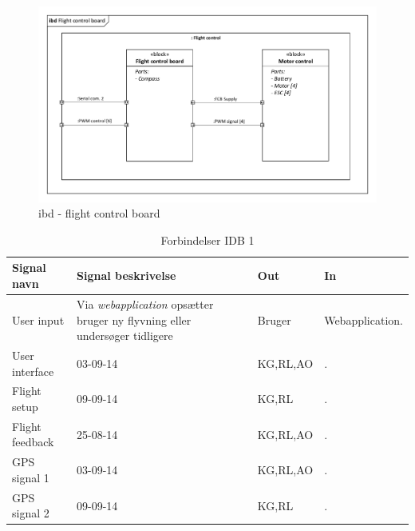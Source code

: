 

\begin{figure}[H]
\centering
\includegraphics[width=1\textwidth]{Billeder/IBD/ibd5_flightcontrolboard.pdf}
\caption{ibd - flight control board}
\label{fig:ibd_flightcontrolboard}
\end{figure}

\begin{table}[H]
	\centering
		\begin{tabular}{|p{2.5 cm}|p{5.5 cm}|p{2.5 cm}|p{2.5 cm}|} 
		\hline
			\textbf{Signal navn} 	& \textbf{Signal beskrivelse}		& \textbf{Out} 				& \textbf{In}     \\ \hline
			User input 			& Via \textit{webapplication} opsætter bruger ny flyvning eller undersøger tidligere & Bruger 		& Webapplication.			    \\ \hline
			User interface 		& 03-09-14	& KG,RL,AO				& .				\\ \hline
			Flight setup		& 09-09-14	& KG,RL					& .	\\ \hline
			Flight feedback		& 25-08-14	& KG,RL,AO				& .			    \\ \hline
			GPS signal 1		& 03-09-14	& KG,RL,AO				& .				\\ \hline
			GPS signal 2		& 09-09-14	& KG,RL					& .	\\ \hline  
		\end{tabular}
	\caption{Forbindelser IDB 1}
	\label{tab:IDB1}
\end{table}



